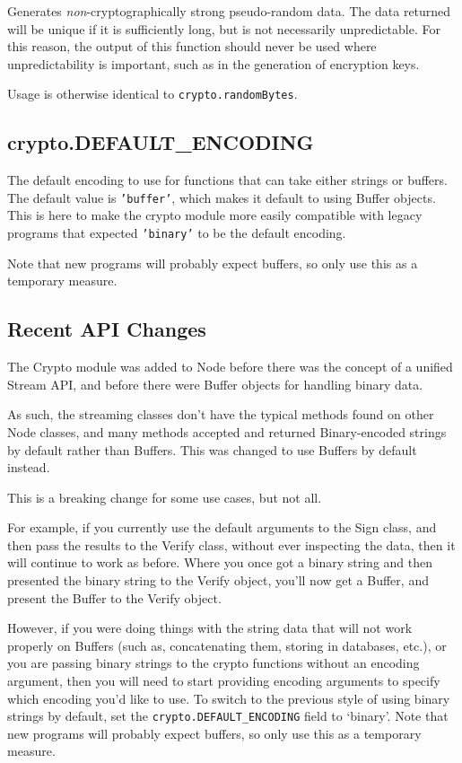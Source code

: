 Generates \emph{non}-cryptographically strong pseudo-random data. The
data returned will be unique if it is sufficiently long, but is not
necessarily unpredictable. For this reason, the output of this function
should never be used where unpredictability is important, such as in the
generation of encryption keys.

Usage is otherwise identical to \texttt{crypto.randomBytes}.

\subsection{crypto.DEFAULT\_ENCODING}

The default encoding to use for functions that can take either strings
or buffers. The default value is \texttt{'buffer'}, which makes it
default to using Buffer objects. This is here to make the crypto module
more easily compatible with legacy programs that expected
\texttt{'binary'} to be the default encoding.

Note that new programs will probably expect buffers, so only use this as
a temporary measure.

\subsection{Recent API Changes}

The Crypto module was added to Node before there was the concept of a
unified Stream API, and before there were Buffer objects for handling
binary data.

As such, the streaming classes don't have the typical methods found on
other Node classes, and many methods accepted and returned
Binary-encoded strings by default rather than Buffers. This was changed
to use Buffers by default instead.

This is a breaking change for some use cases, but not all.

For example, if you currently use the default arguments to the Sign
class, and then pass the results to the Verify class, without ever
inspecting the data, then it will continue to work as before. Where you
once got a binary string and then presented the binary string to the
Verify object, you'll now get a Buffer, and present the Buffer to the
Verify object.

However, if you were doing things with the string data that will not
work properly on Buffers (such as, concatenating them, storing in
databases, etc.), or you are passing binary strings to the crypto
functions without an encoding argument, then you will need to start
providing encoding arguments to specify which encoding you'd like to
use. To switch to the previous style of using binary strings by default,
set the \texttt{crypto.DEFAULT\_ENCODING} field to `binary'. Note that
new programs will probably expect buffers, so only use this as a
temporary measure.
